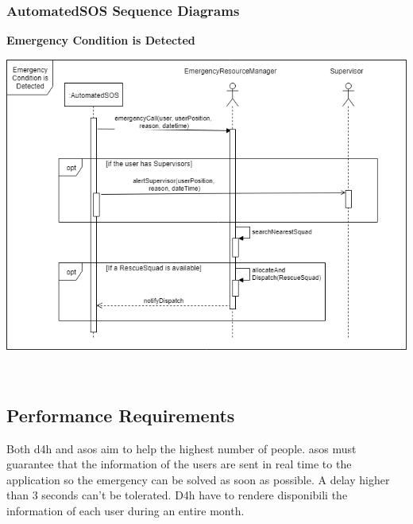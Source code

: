 {\color{Blue}\subsubsection{AutomatedSOS Sequence Diagrams}}

\textbf{Emergency Condition is Detected}\par
\begin{center}
	\includegraphics[scale=0.6]{Images/UML/EmergencyConditionsSeq.png}
\end{center}










\
{\color{Blue}\subsection{Performance Requirements}}

Both d4h and asos aim to help the highest number of people. asos must guarantee that the information of the users are sent in real time to the application so the emergency can be solved as soon as possible. A delay higher than 3 seconds can’t be tolerated. D4h have to rendere disponibili the information of each user during an entire month.
